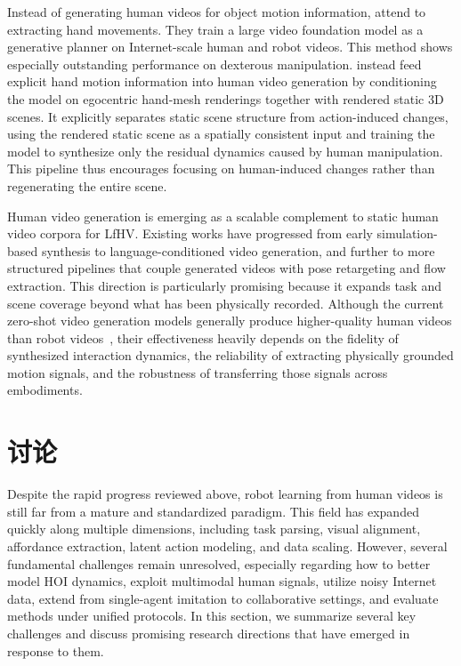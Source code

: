 \documentclass[Afour,sageh,times]{sagej}
\begin{document}
Instead of generating human videos for object motion information, \cite{chen2025large} attend to extracting hand movements. They train a large video foundation model as a generative planner on Internet-scale human and robot videos. This method shows especially outstanding performance on dexterous manipulation. \cite{kim2025dexterous} instead feed explicit hand motion information into human video generation by conditioning the model on egocentric hand-mesh renderings together with rendered static 3D scenes. It explicitly separates static scene structure from action-induced changes, using the rendered static scene as a spatially consistent input and training the model to synthesize only the residual dynamics caused by human manipulation. This pipeline thus encourages focusing on human-induced changes rather than regenerating the entire scene.

Human video generation is emerging as a scalable complement to static human video corpora for LfHV. Existing works have progressed from early simulation-based synthesis to language-conditioned video generation, and further to more structured pipelines that couple generated videos with pose retargeting and flow extraction. This direction is particularly promising because it expands task and scene coverage beyond what has been physically recorded. Although the current zero-shot video generation models generally produce higher-quality human videos than robot videos~\citep{bharadhwaj2024gen2act}, their effectiveness heavily depends on the fidelity of synthesized interaction dynamics, the reliability of extracting physically grounded motion signals, and the robustness of transferring those signals across embodiments.

\section{讨论} \label{sec:discussion}

Despite the rapid progress reviewed above, robot learning from human videos is still far from a mature and standardized paradigm. This field has expanded quickly along multiple dimensions, including task parsing, visual alignment, affordance extraction, latent action modeling, and data scaling. However, several fundamental challenges remain unresolved, especially regarding how to better model HOI dynamics, exploit multimodal human signals, utilize noisy Internet data, extend from single-agent imitation to collaborative settings, and evaluate methods under unified protocols. In this section, we summarize several key challenges and discuss promising research directions that have emerged in response to them.
\end{document}
